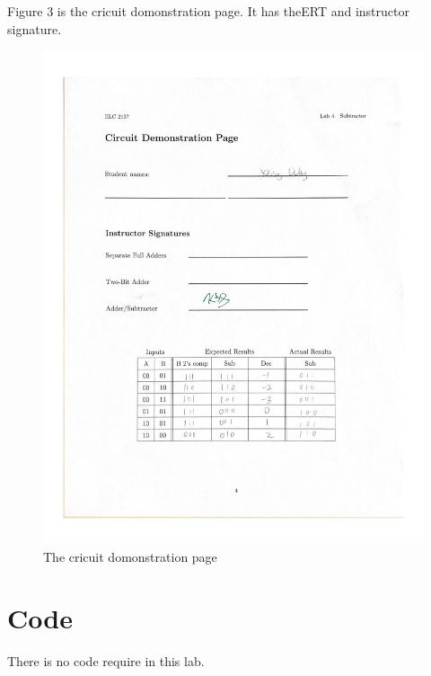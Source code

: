 \documentclass[11pt]{article}
\begin{document}
	Figure 3 is the cricuit domonstration page. It has theERT and instructor signature.\\
	\begin{figure}[ht]\centering
		\includegraphics[width=1.0\textwidth]{Lab4Page}
		\caption{The cricuit domonstration page}
		\label{fig:Lab4Page}
	\end{figure}



\section*{Code}

	There is no code require in this lab.\\	
\end{document}
